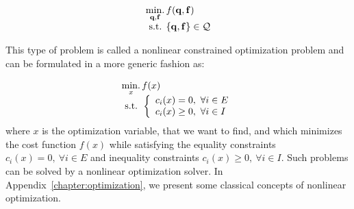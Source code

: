 
\begin{equation}
  \begin{array}{l}
    \operatorname*{min.}\limits_{\mathbf{q}, \mathbf{f}}{f(\mathbf{q}, \mathbf{f})}\\
    \text{ s.t. }\{\mathbf{q}, \mathbf{f}\}\in\mathcal{Q}
  \end{array}
\end{equation}

This type of problem is called a nonlinear constrained optimization problem and can be formulated in a more generic fashion as:

\begin{equation}
\label{eq:optim_form_PG}
  \begin{array}{l}
    \operatorname*{min.}\limits_{x}{f(x)}\\
    \text{ s.t. }
    \left\{
    \begin{array}{l}
      c_i(x) = 0,\ \forall i\in{E}\\
      c_i(x) \geq 0,\ \forall i\in{I}\\
    \end{array}
    \right.
  \end{array}
\end{equation}
where $x$ is the optimization variable, that we want to find, and which minimizes the cost function $f(x)$ while satisfying the equality constraints $c_i(x) = 0,\ \forall i\in{E}$ and inequality constraints $c_i(x) \geq 0,\ \forall i\in{I}$.
Such problems can be solved by a nonlinear optimization solver.
In Appendix~\ref{chapter:optimization}, we present some classical concepts of nonlinear optimization.

